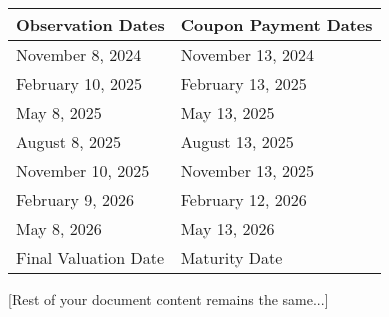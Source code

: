 \documentclass[12pt]{article}
\begin{document}
\vspace{0.3cm}
\begin{tabular}{|l|l|}
\hline
\textbf{Observation Dates} & \textbf{Coupon Payment Dates} \\
\hline
November 8, 2024 & November 13, 2024 \\
February 10, 2025 & February 13, 2025 \\
May 8, 2025 & May 13, 2025 \\
August 8, 2025 & August 13, 2025 \\
November 10, 2025 & November 13, 2025 \\
February 9, 2026 & February 12, 2026 \\
May 8, 2026 & May 13, 2026 \\
Final Valuation Date & Maturity Date \\
\hline
\end{tabular}

[Rest of your document content remains the same...]
\end{document}

